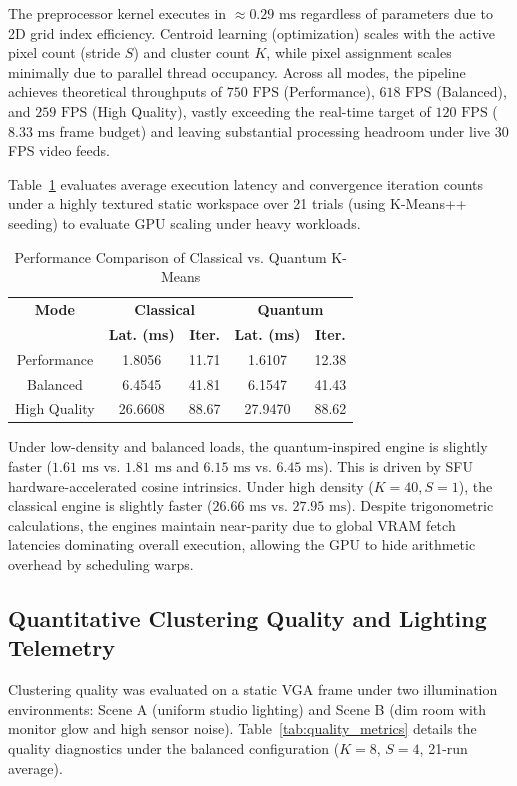 The preprocessor kernel executes in $\approx 0.29\text{ ms}$ regardless of parameters due to 2D grid index efficiency. Centroid learning (optimization) scales with the active pixel count (stride $S$) and cluster count $K$, while pixel assignment scales minimally due to parallel thread occupancy. Across all modes, the pipeline achieves theoretical throughputs of $750\text{ FPS}$ (Performance), $618\text{ FPS}$ (Balanced), and $259\text{ FPS}$ (High Quality), vastly exceeding the real-time target of $120\text{ FPS}$ ($8.33\text{ ms}$ frame budget) and leaving substantial processing headroom under live 30 FPS video feeds.

Table~\ref{tab:latency_benchmarks} evaluates average execution latency and convergence iteration counts under a highly textured static workspace over 21 trials (using K-Means++ seeding) to evaluate GPU scaling under heavy workloads.

\begin{table}[b]
\centering
\small
\caption{Performance Comparison of Classical vs. Quantum K-Means}
\label{tab:latency_benchmarks}
\begin{tabular}{ccccc}
\hline
\textbf{Mode} & \multicolumn{2}{c}{\textbf{Classical}} & \multicolumn{2}{c}{\textbf{Quantum}} \\
 & \textbf{Lat. (ms)} & \textbf{Iter.} & \textbf{Lat. (ms)} & \textbf{Iter.} \\ \hline
Performance  & 1.8056  & 11.71  & 1.6107  & 12.38  \\
Balanced     & 6.4545  & 41.81  & 6.1547  & 41.43  \\
High Quality & 26.6608 & 88.67  & 27.9470 & 88.62  \\ \hline
\end{tabular}
\end{table}

Under low-density and balanced loads, the quantum-inspired engine is slightly faster ($1.61\text{ ms}$ vs. $1.81\text{ ms}$ and $6.15\text{ ms}$ vs. $6.45\text{ ms}$). This is driven by SFU hardware-accelerated cosine intrinsics. Under high density ($K=40, S=1$), the classical engine is slightly faster ($26.66\text{ ms}$ vs. $27.95\text{ ms}$). Despite trigonometric calculations, the engines maintain near-parity due to global VRAM fetch latencies dominating overall execution, allowing the GPU to hide arithmetic overhead by scheduling warps.

\subsection{Quantitative Clustering Quality and Lighting Telemetry}
Clustering quality was evaluated on a static VGA frame under two illumination environments: Scene A (uniform studio lighting) and Scene B (dim room with monitor glow and high sensor noise). Table~\ref{tab:quality_metrics} details the quality diagnostics under the balanced configuration ($K=8$, $S=4$, 21-run average).

